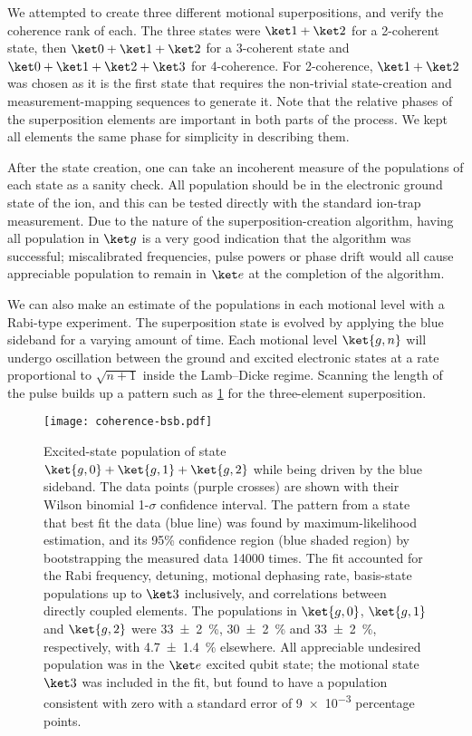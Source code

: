 We attempted to create three different motional superpositions, and verify the coherence rank of each.
The three states were $\ket1+\ket2$ for a 2-coherent state, then $\ket0+\ket1+\ket2$ for a 3-coherent state and $\ket0+\ket1+\ket2+\ket3$ for 4-coherence.
For 2-coherence, $\ket1+\ket2$ was chosen as it is the first state that requires the non-trivial state-creation and measurement-mapping sequences to generate it.
Note that the relative phases of the superposition elements are important in both parts of the process.
We kept all elements the same phase for simplicity in describing them.

After the state creation, one can take an incoherent measure of the populations of each state as a sanity check.
All population should be in the electronic ground state of the ion, and this can be tested directly with the standard ion-trap measurement.
Due to the nature of the superposition-creation algorithm, having all population in $\ket g$ is a very good indication that the algorithm was successful; miscalibrated frequencies, pulse powers or phase drift would all cause appreciable population to remain in $\ket e$ at the completion of the algorithm.

We can also make an estimate of the populations in each motional level with a Rabi-type experiment.
The superposition state is evolved by applying the blue sideband for a varying amount of time.
Each motional level $\ket{g,n}$ will undergo oscillation between the ground and excited electronic states at a rate proportional to $\sqrt{n+1}$ inside the Lamb--Dicke regime.
Scanning the length of the pulse builds up a pattern such as \cref{fig:coherence-bsb} for the three-element superposition.

\begin{figure*}%
    \texttt{[image: coherence-bsb.pdf]}%
    \caption[Dynamics of the motional blue sideband transition]{\label{fig:coherence-bsb}%
    Excited-state population of state $\ket{g,0} + \ket{g,1} + \ket{g,2}$ while being driven by the blue sideband.
    The data points (purple crosses) are shown with their Wilson binomial 1-$\sigma$ confidence interval.
    The pattern from a state that best fit the data (blue line) was found by maximum-likelihood estimation, and its 95\% confidence region (blue shaded region) by bootstrapping the measured data \num{14000} times.
    The fit accounted for the Rabi frequency, detuning, motional dephasing rate, basis-state populations up to $\ket3$ inclusively, and correlations between directly coupled elements.
    The populations in $\ket{g,0}$, $\ket{g,1}$ and $\ket{g,2}$ were \SI{33(2)}{\percent}, \SI{30(2)}{\percent} and \SI{33(2)}{\percent}, respectively, with \SI{4.7(14)}{\percent} elsewhere.
    All appreciable undesired population was in the $\ket e$ excited qubit state; the motional state $\ket3$ was included in the fit, but found to have a population consistent with zero with a standard error of \num{9e-3} percentage points.
}
\end{figure*}

